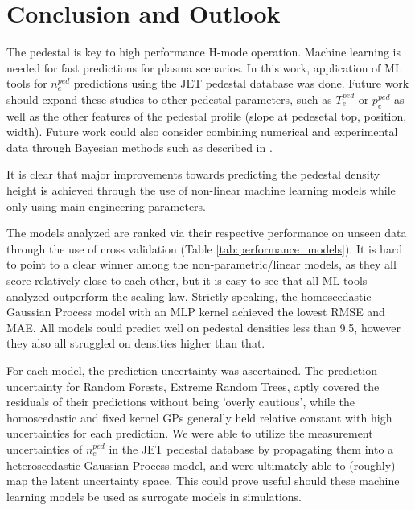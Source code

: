 \documentclass[a4paper, twoside, final, 12pt]{article}
\begin{document}
{\section{Conclusion and Outlook}
The pedestal is key to high performance H-mode operation. Machine learning is needed for fast predictions for plasma scenarios. In this work, application of ML tools for $n_e^{ped}$ predictions using the JET pedestal database was done. Future work should expand these studies to other pedestal parameters, such as $T_e^{ped} \text{ or } p_e^{ped}$ as well as the other features of the pedestal profile (slope at pedesetal top, position, width). Future work could also consider combining numerical and experimental data through Bayesian methods such as described in \cite{WU2018417}. 

It is clear that major improvements towards predicting the pedestal density height is achieved through the use of non-linear machine learning models while only using main engineering parameters.

The models analyzed are ranked via their respective performance on unseen data through the use of cross validation (Table \ref{tab:performance_models}).
It is hard to point to a clear winner among the non-parametric/linear models, as they all score relatively close to each other, but it is easy to see that all ML tools analyzed outperform the scaling law. Strictly speaking, the homoscedastic Gaussian Process model with an MLP kernel achieved the lowest RMSE and MAE. All models could predict well on pedestal densities less than 9.5, however they also all struggled on densities higher than that.

For each model, the prediction uncertainty was ascertained. The prediction uncertainty for Random Forests, Extreme Random Trees, aptly covered the residuals of their predictions without being 'overly cautious', while the homoscedastic and fixed kernel GPs generally held relative constant with high uncertainties for each prediction. We were able to utilize the measurement uncertainties of $n_e^{ped}$ in the JET pedestal database by propagating them into a heteroscedastic Gaussian Process model, and were ultimately able to (roughly) map the latent uncertainty space. This could prove useful should these machine learning models be used as surrogate models in simulations.

}
\end{document}
